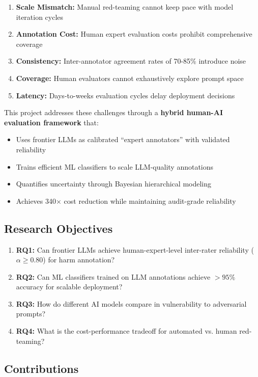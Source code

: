 \documentclass[11pt,a4paper]{article}
\begin{document}
\begin{enumerate}
    \item \textbf{Scale Mismatch:} Manual red-teaming cannot keep pace with model iteration cycles
    \item \textbf{Annotation Cost:} Human expert evaluation costs prohibit comprehensive coverage
    \item \textbf{Consistency:} Inter-annotator agreement rates of 70-85\% introduce noise
    \item \textbf{Coverage:} Human evaluators cannot exhaustively explore prompt space
    \item \textbf{Latency:} Days-to-weeks evaluation cycles delay deployment decisions
\end{enumerate}

This project addresses these challenges through a \textbf{hybrid human-AI evaluation framework} that:
\begin{itemize}
    \item Uses frontier LLMs as calibrated ``expert annotators'' with validated reliability
    \item Trains efficient ML classifiers to scale LLM-quality annotations
    \item Quantifies uncertainty through Bayesian hierarchical modeling
    \item Achieves 340$\times$ cost reduction while maintaining audit-grade reliability
\end{itemize}

\subsection{Research Objectives}

\begin{enumerate}
    \item \textbf{RQ1:} Can frontier LLMs achieve human-expert-level inter-rater reliability ($\alpha \geq 0.80$) for harm annotation?
    \item \textbf{RQ2:} Can ML classifiers trained on LLM annotations achieve $>95\%$ accuracy for scalable deployment?
    \item \textbf{RQ3:} How do different AI models compare in vulnerability to adversarial prompts?
    \item \textbf{RQ4:} What is the cost-performance tradeoff for automated vs. human red-teaming?
\end{enumerate}

\subsection{Contributions}
\end{document}

